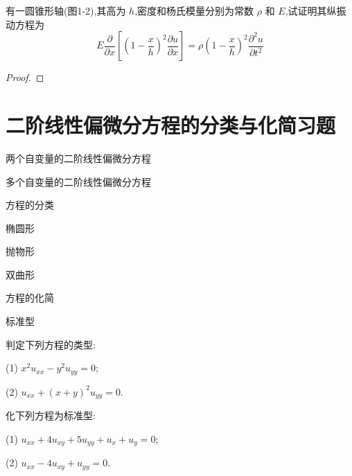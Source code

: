 \documentclass[color=blue,lang=cn,newtx,10pt,scheme=chinese]{elegantbook}
\begin{document}
\begin{solution}
  
\end{solution}
\quad

\begin{exercise}
有一圆锥形轴(图1-2),其高为 $h$,密度和杨氏模量分别为常数 $\rho$ 和 $E$,试证明其纵振动方程为
\begin{equation}
  E\frac{\partial}{\partial x}[(1-\frac{x}{h})^2\frac{\partial u}{\partial x}]=\rho (1-\frac{x}{h})^2\frac{\partial^2 u}{\partial t^2}
\end{equation}
\end{exercise}
\quad

\begin{proof}
  
\end{proof}
\quad




\chapter{二阶线性偏微分方程的分类与化简习题}%

\begin{introduction}
  \item 两个自变量的二阶线性偏微分方程
  \item 多个自变量的二阶线性偏微分方程
  \item 方程的分类
  \item 椭圆形
  \item 抛物形
  \item 双曲形
  \item 方程的化简
  \item 标准型
\end{introduction}
\quad

\begin{exercise}
判定下列方程的类型:

(1) $x^2u_{xx}-y^2u_{yy}=0$;

(2) $u_{xx}+(x+y)^2u_{yy}=0$.
\end{exercise}
\quad

\begin{solution}
  
\end{solution}
\quad

\begin{exercise}
化下列方程为标准型:

(1) $u_{xx}+4u_{xy}+5u_{yy}+u_x+u_y=0$;

(2) $u_{xx}-4u_{xy}+u_{yy}=0$.
\end{exercise}
\quad
\end{document}
